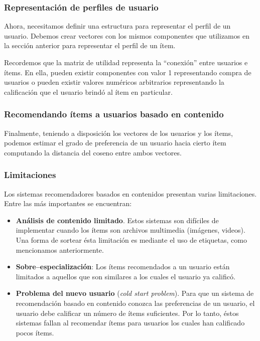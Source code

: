 			\subsubsection{Representación de perfiles de usuario}
				Ahora, necesitamos definir una estructura para representar el perfil de un usuario. Debemos crear vectores con los mismos componentes que utilizamos en la sección anterior para representar el perfil de un ítem. \par
				
				Recordemos que la matriz de utilidad representa la \enquote{conexión} entre usuarios e ítems. En ella, pueden existir componentes con valor 1 representando compra de usuarios o pueden existir valores numéricos arbitrarios representando la calificación que el usuario brindó al ítem en particular. \par
				
			\subsubsection{Recomendando ítems a usuarios basado en contenido}	
				Finalmente, teniendo a disposición los vectores de los usuarios y los ítems, podemos estimar el grado de preferencia de un usuario hacia cierto ítem computando la distancia del coseno entre ambos vectores.
				
			\subsubsection{Limitaciones}
				Los sistemas recomendadores basados en contenidos presentan varias limitaciones. Entre las más importantes se encuentran:
				\begin{itemize}
					\item \textbf{Análisis de contenido limitado}. Estos sistemas son difíciles de implementar cuando los ítems son archivos multimedia (imágenes, videos). Una forma de sortear ésta limitación es mediante el uso de etiquetas, como mencionamos anteriormente.
					\item \textbf{Sobre--especialización}: Los ítems recomendados a un usuario están limitados a aquellos que son similares a los cuales el usuario ya calificó.
					\item \textbf{Problema del nuevo usuario} (\textit{cold start problem}). Para que un sistema de recomendación basado en contenido conozca las preferencias de un usuario, el usuario debe calificar un número de ítems suficientes. Por lo tanto, éstos sistemas fallan al recomendar ítems para usuarios los cuales han calificado pocos ítems.
				\end{itemize}
			
